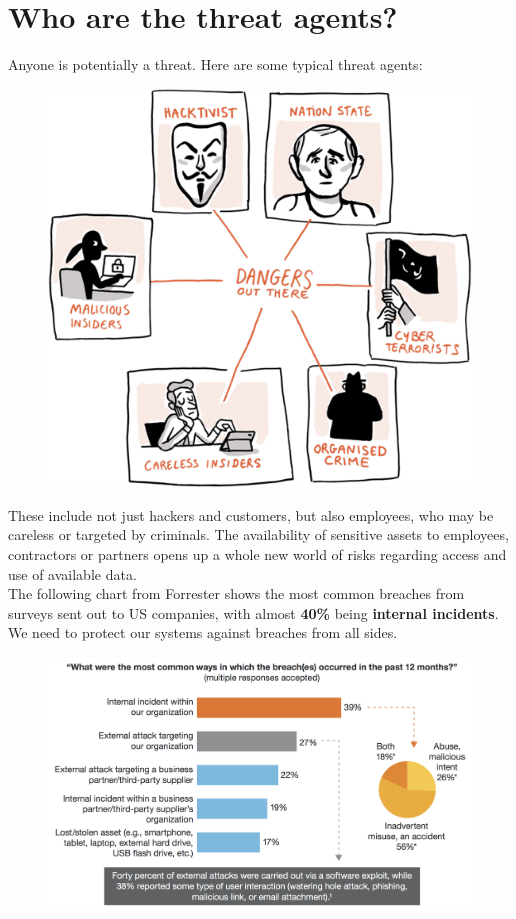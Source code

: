 \documentclass[a5paper,pagesize,10pt,bibtotoc,DIV=10,twoside]{scrbook}
\begin{document}
\section{Who are the threat agents?}

Anyone is potentially a threat. Here are some typical threat agents:

\begin{figure}[H]
\centering
\includegraphics[scale=0.4]{images/ThreatAgents}
\end{figure}

These include not just hackers and customers, but also employees, who may be careless or targeted by criminals. The availability of sensitive assets to employees, contractors or partners opens up a whole new world of risks regarding access and use of available data. \\ 

The following chart from Forrester shows the most common breaches from surveys sent out to US companies, with almost \textbf{40\%} being \textbf{internal incidents}. We need to protect our systems against breaches from all sides.\\

\begin{figure}[htbp]
\hspace*{-1.5cm} 
\includegraphics[scale=0.26]{images/Forrester}
\end{figure}
\end{document}
